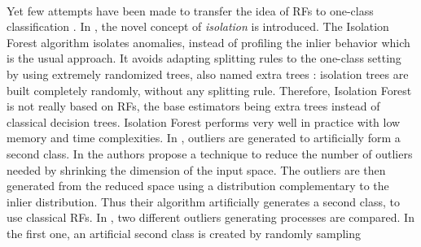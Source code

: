 \paragraph{}
Yet few attempts have been made to transfer the idea of \acp{RF} to one-class
classification \citep{Desir13, Liu2008, Shi2012}.
%
In \citet{Liu2008}, the novel concept of \emph{isolation} is introduced. The
Isolation Forest algorithm isolates anomalies, instead of profiling the inlier
behavior which is the usual approach. It avoids adapting splitting rules to
the one-class setting by using extremely randomized trees, also named extra
trees \citep{Geurts2006}: isolation trees are built completely randomly,
without any splitting rule.
Therefore, Isolation Forest is not really based on \acp{RF}, the base
estimators being extra trees instead of classical decision trees. Isolation
Forest performs very well in practice with low memory and time complexities.
In \citet{Desir13, Shi2012}, outliers are generated to artificially form a
second class.
%
In \citet{Desir13} the authors propose a technique to reduce the number of
outliers needed by shrinking the dimension of the input space. The outliers
are then generated from the reduced space using a distribution complementary
to the inlier distribution. Thus their algorithm artificially generates a
second class, to use classical \acp{RF}.
%
In \citet{Shi2012}, two different outliers generating processes are compared.
In the first one, an artificial second class is created by randomly sampling
